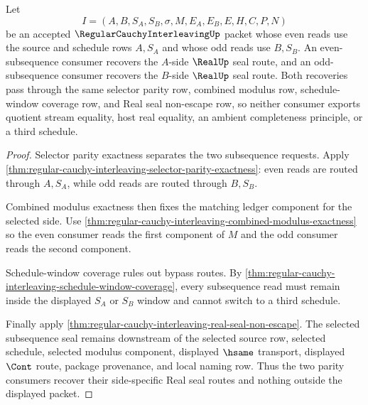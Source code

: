 \begin{theorem}
\label{thm:regular-cauchy-interleaving-even-odd-subsequence-seal}
Let
$$
I=(A,B,S_A,S_B,\sigma,M,E_A,E_B,E,H,C,P,N)
$$
be an accepted $\RegularCauchyInterleavingUp$ packet whose even reads use the source and schedule rows $A,S_A$ and whose odd reads use $B,S_B$. An even-subsequence consumer recovers the $A$-side $\RealUp$ seal route, and an odd-subsequence consumer recovers the $B$-side $\RealUp$ seal route. Both recoveries pass through the same selector parity row, combined modulus row, schedule-window coverage row, and Real seal non-escape row, so neither consumer exports quotient stream equality, host real equality, an ambient completeness principle, or a third schedule.
\end{theorem}
\begin{proof}
Selector parity exactness separates the two subsequence requests. Apply \autoref{thm:regular-cauchy-interleaving-selector-parity-exactness}: even reads are routed through $A,S_A$, while odd reads are routed through $B,S_B$.

Combined modulus exactness then fixes the matching ledger component for the selected side. Use \autoref{thm:regular-cauchy-interleaving-combined-modulus-exactness} so the even consumer reads the first component of $M$ and the odd consumer reads the second component.

Schedule-window coverage rules out bypass routes. By \autoref{thm:regular-cauchy-interleaving-schedule-window-coverage}, every subsequence read must remain inside the displayed $S_A$ or $S_B$ window and cannot switch to a third schedule.

Finally apply \autoref{thm:regular-cauchy-interleaving-real-seal-non-escape}. The selected subsequence seal remains downstream of the selected source row, selected schedule, selected modulus component, displayed $\hsame$ transport, displayed $\Cont$ route, package provenance, and local naming row. Thus the two parity consumers recover their side-specific Real seal routes and nothing outside the displayed packet.
\end{proof}

